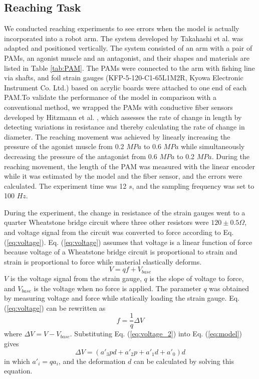 \subsection{Reaching Task}
We conducted reaching experiments to see errors when the model is actually incorporated into a robot arm. The system developed by Takahashi et al.\cite{takahashi} was adapted and positioned vertically. The system consisted of an arm with a pair of PAMs, an agonist muscle and an antagonist, and their shapes and materials are listed in Table \ref{tab:PAM}. The PAMs were connected to the arm with fishing line via shafts, and foil strain gauges (KFP-5-120-C1-65L1M2R, Kyowa Electronic Instrument Co. Ltd.) based on acrylic boards were attached to one end of each PAM.To validate the performance of the model in comparison with a conventional method, we wrapped the PAMs with conductive fiber sensors developed by Hitzmann et al. \cite{fiber}, which assesses the rate of change in length by detecting variations in resistance and thereby calculating the rate of change in diameter.
The reaching movement was achieved by linearly increasing the pressure of the agonist muscle from 0.2 $\si{MPa}$ to 0.6 $\si{MPa}$ while simultaneously decreasing the pressure of the antagonist from 0.6 $\si{MPa}$ to 0.2 $\si{MPa}$. During the reaching movement, the length of the PAM was measured with the linear encoder while it was estimated by the model and the fiber sensor, and the errors were calculated. The experiment time was 12 $\si{s}$, and the sampling frequency was set to 100 $\si{Hz}$.

During the experiment, the change in resistance of the strain gauges went to a quarter Wheatstone bridge circuit where three other resistors were $120 \pm 0.5 \Omega$, and voltage signal from the circuit was converted to force according to Eq. (\ref{eq:voltage}). Eq. (\ref{eq:voltage}) assumes that voltage is a linear function of force because voltage of a Wheatstone bridge circuit is proportional to strain\cite{wheatstone} and strain is proportional to force while material elastically deforms.
\begin{equation}
    \label{eq:voltage}
    V=qf+V_{base}
\end{equation}
$V$ is the voltage signal from the strain gauge, $q$ is the slope of voltage to force, and $V_{base}$ is the voltage when no force is applied.
The parameter $q$ was obtained by measuring voltage and force while statically loading the strain gauge.
Eq.(\ref{eq:voltage}) can be rewritten as
\begin{equation}
    \label{eq:voltage_2}
    f = \frac{1}{q}\Delta V
\end{equation}
where $\Delta V = V - V_{base}$. Substituting Eq. (\ref{eq:voltage_2}) into Eq. (\ref{eq:model}) gives
\begin{equation}
    \label{eq:model_voltage}
    \Delta V = (a'_3pd + a'_2p + a'_1d + a'_0)d
\end{equation}
in which $a'_i=qa_i$, and the deformation $d$ can be calculated by solving this equation.

